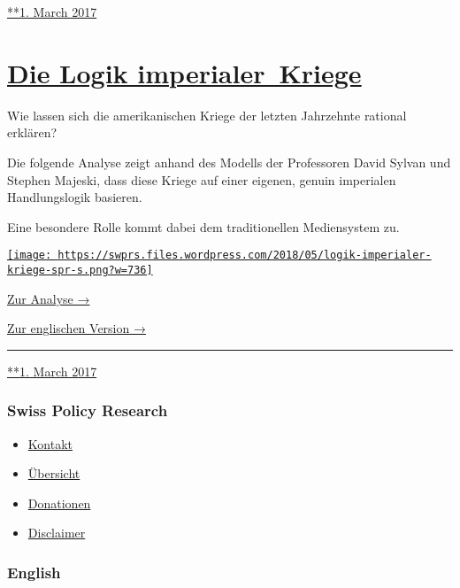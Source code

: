 \href{https://swprs.org/2017/03/01/der-kriegsreporter/}{**1. March 2017}

\hypertarget{die-logik-imperialer-kriege}{%
\section{\texorpdfstring{\href{https://swprs.org/2017/03/01/die-logik-imperialer-kriege/}{Die
Logik
imperialer~Kriege}}{Die Logik imperialer~Kriege}}\label{die-logik-imperialer-kriege}}

Wie lassen sich die amerikanischen Kriege der letzten Jahrzehnte
rational erklären?

Die folgende Analyse zeigt anhand des Modells der Professoren David
Sylvan und Stephen Majeski, dass diese Kriege auf einer eigenen, genuin
imperialen Handlungslogik basieren.

Eine besondere Rolle kommt dabei dem traditionellen Mediensystem zu.

\href{https://swprs.org/logik-imperialer-kriege/}{\texttt{[image: https://swprs.files.wordpress.com/2018/05/logik-imperialer-kriege-spr-s.png?w=736]}}

\href{https://swprs.org/logik-imperialer-kriege/}{Zur Analyse →}

\href{https://swprs.org/us-foreign-policy/}{Zur englischen Version →}

\begin{center}\rule{0.5\linewidth}{\linethickness}\end{center}

\href{https://swprs.org/2017/03/01/die-logik-imperialer-kriege/}{**1.
March 2017}

\hypertarget{swiss-policy-research}{%
\subsubsection{Swiss Policy Research}\label{swiss-policy-research}}

\begin{itemize}
\tightlist
\item
  \href{https://swprs.org/kontakt/}{Kontakt}
\item
  \href{https://swprs.org/uebersicht/}{Übersicht}
\item
  \href{https://swprs.org/donationen/}{Donationen}
\item
  \href{https://swprs.org/disclaimer/}{Disclaimer}
\end{itemize}

\hypertarget{english}{%
\subsubsection{English}\label{english}}

